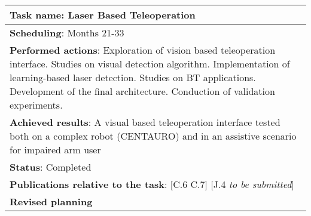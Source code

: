 \begin{table}[H]
	\begin{center}
		\renewcommand{\arraystretch}{1.3} %
		\setlength{\tabcolsep}{8pt} %
		\begin{tabular}{|P{15cm}|}
			\hline
			\textbf{Task name}: Laser Based Teleoperation \\ \hline
			\textbf{Scheduling}: Months 21-33 \\ \hline
			\textbf{Performed actions}: Exploration of vision based teleoperation interface. Studies on visual detection algorithm. Implementation of learning-based laser detection. Studies on BT applications. Development of the final architecture. Conduction of validation experiments.\\
			\hline
			\textbf{Achieved results}: A visual based teleoperation interface tested both on a complex robot (CENTAURO) and in an assistive scenario for impaired arm user\\
			\hline
			\textbf{Status}: Completed\\
			\hline
			\textbf{Publications relative to the task}: [C.6 C.7] [J.4 \textit{to be submitted}]\\
			\hline
			\textbf{Revised planning}\\
			\hline
		\end{tabular}
	\end{center}
\end{table}
